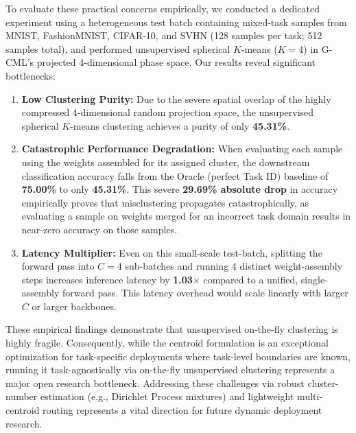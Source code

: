 To evaluate these practical concerns empirically, we conducted a dedicated experiment using a heterogeneous test batch containing mixed-task samples from MNIST, FashionMNIST, CIFAR-10, and SVHN (128 samples per task; 512 samples total), and performed unsupervised spherical $K$-means ($K=4$) in G-CML's projected 4-dimensional phase space. Our results reveal significant bottlenecks:
\begin{enumerate}
    \item \textbf{Low Clustering Purity:} Due to the severe spatial overlap of the highly compressed 4-dimensional random projection space, the unsupervised spherical $K$-means clustering achieves a purity of only \textbf{45.31\%}.
    \item \textbf{Catastrophic Performance Degradation:} When evaluating each sample using the weights assembled for its assigned cluster, the downstream classification accuracy falls from the Oracle (perfect Task ID) baseline of \textbf{75.00\%} to only \textbf{45.31\%}. This severe \textbf{29.69\% absolute drop} in accuracy empirically proves that misclustering propagates catastrophically, as evaluating a sample on weights merged for an incorrect task domain results in near-zero accuracy on those samples.
    \item \textbf{Latency Multiplier:} Even on this small-scale test-batch, splitting the forward pass into $C=4$ sub-batches and running 4 distinct weight-assembly steps increases inference latency by \textbf{1.03$\times$} compared to a unified, single-assembly forward pass. This latency overhead would scale linearly with larger $C$ or larger backbones.
\end{enumerate}
These empirical findings demonstrate that unsupervised on-the-fly clustering is highly fragile. Consequently, while the centroid formulation is an exceptional optimization for task-specific deployments where task-level boundaries are known, running it task-agnostically via on-the-fly unsupervised clustering represents a major open research bottleneck. Addressing these challenges via robust cluster-number estimation (e.g., Dirichlet Process mixtures) and lightweight multi-centroid routing represents a vital direction for future dynamic deployment research.

